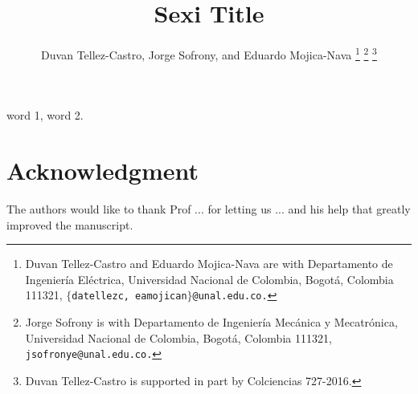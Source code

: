 \documentclass[letterpaper,10pt,conference,draftcls,onecolumn]{ieeeconf} %
\theoremstyle{plain}
\begin{document}
\title{\LARGE \bf Sexi Title}

\author{Duvan Tellez-Castro,
        Jorge Sofrony,
        and Eduardo Mojica-Nava
\thanks{Duvan Tellez-Castro and Eduardo Mojica-Nava are with Departamento de Ingenier\'ia El\'ectrica, Universidad Nacional de Colombia, Bogot\'a, Colombia 111321, $\{$\texttt{datellezc, eamojican$\}$@unal.edu.co.}}        
\thanks{Jorge Sofrony is with Departamento de Ingenier\'ia
Mec\'anica y Mecatr\'onica, Universidad Nacional de Colombia, Bogot\'a, Colombia 111321, \texttt{jsofronye@unal.edu.co.}}
\thanks{Duvan Tellez-Castro is supported in part by Colciencias 727-2016.}
}        
 
\maketitle

\begin{abstract}

 
 
\end{abstract}
\begin{keywords}
	word 1, word 2. %
\end{keywords}



 
 
 
\section*{Acknowledgment}
The authors would like to thank Prof ... for  letting us ... and his help that greatly improved the manuscript.
%
\end{document}
